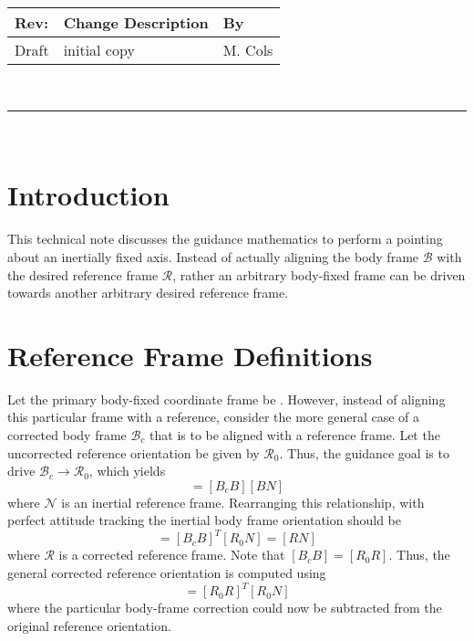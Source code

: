 \documentclass[]{AVSSimReportMemo}
\begin{document}
\makeCover


%
%
\pagestyle{empty}
{\renewcommand{\arraystretch}{2}
\noindent
\begin{longtable}{|p{0.5in}|p{4.5in}|p{1.14in}|}
\hline
{\bfseries Rev}: & {\bfseries Change Description} & {\bfseries By} \\
\hline
Draft & initial copy & M. Cols \\
\hline

\end{longtable}
}

\newpage
\setcounter{page}{1}
\pagestyle{fancy}

\tableofcontents
~\\ \hrule ~\\


\section{Introduction}
This technical note discusses the guidance mathematics to perform a pointing about an inertially fixed axis.  Instead of actually aligning the body frame $\mathcal{B}$ with the desired reference frame $\mathcal{R}$, rather an arbitrary body-fixed frame can be driven towards another arbitrary desired reference frame.  


\section{Reference Frame Definitions}
Let the primary body-fixed coordinate frame be . However, instead of aligning this particular frame with a reference, consider the more general case of a corrected body frame $\mathcal{B}_{c}$ that is to be aligned with a reference frame.   Let the uncorrected reference orientation be given by $\mathcal{R}_{0}$.  Thus, the guidance goal is to drive $\mathcal{B}_{c} \rightarrow \mathcal{R}_{0}$, which yields
\begin{equation}
	[R_{0} N] = [B_{c} B] [BN]
\end{equation}
where $\mathcal{N}$ is an inertial reference frame.  Rearranging this relationship, with perfect attitude tracking the inertial body frame orientation should be
\begin{equation}
	 [BN] = [B_{c} B]^{T} [R_{0}N]  = [RN]
\end{equation}
where $\mathcal{R}$ is a corrected reference frame.  Note that $[B_{c} B] = [R_{0}R]$.  Thus, the general corrected reference orientation is computed using
\begin{equation}
	 [RN] = [R_{0} R]^{T} [R_{0}N] 
\end{equation}
where the particular body-frame correction could now be subtracted from the original reference orientation.  
\end{document}
